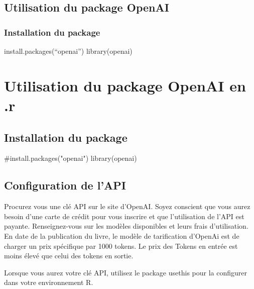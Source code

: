 \documentclass[
  letterpaper,
]{scrbook}
\newenvironment{Shaded}{\begin{snugshade}}{\end{snugshade}}
\newcommand{\CommentTok}[1]{\textcolor[rgb]{0.37,0.37,0.37}{#1}}
\newcommand{\FunctionTok}[1]{\textcolor[rgb]{0.28,0.35,0.67}{#1}}
\newcommand{\NormalTok}[1]{\textcolor[rgb]{0.00,0.23,0.31}{#1}}
\begin{document}
\hypertarget{utilisation-du-package-openai}{%
\section{Utilisation du package
OpenAI}\label{utilisation-du-package-openai}}

\hypertarget{installation-du-package}{%
\subsection{Installation du package}\label{installation-du-package}}

install.packages(``openai'') library(openai)


\hypertarget{utilisation-du-package-openai-en-.r}{%
\chapter{Utilisation du package OpenAI en
.r}\label{utilisation-du-package-openai-en-.r}}

\hypertarget{installation-du-package-1}{%
\section{Installation du package}\label{installation-du-package-1}}

\begin{Shaded}
\begin{Highlighting}[]
\CommentTok{\#install.packages("openai")}
\FunctionTok{library}\NormalTok{(openai)}
\end{Highlighting}
\end{Shaded}

\hypertarget{configuration-de-lapi}{%
\section{Configuration de l'API}\label{configuration-de-lapi}}

Procurez vous une clé API sur le site d'OpenAI. Soyez conscient que vous
aurez besoin d'une carte de crédit pour vous inscrire et que
l'utilisation de l'API est payante. Renseignez-vous sur les modèles
disponibles et leurs frais d'utilisation. En date de la publication du
livre, le modèle de tarification d'OpenAi est de charger un prix
spécifique par 1000 tokens. Le prix des Tokens en entrée est moins élevé
que celui des tokens en sortie.

Lorsque vous aurez votre clé API, utilisez le package usethis pour la
configurer dans votre environnement R.
\end{document}
